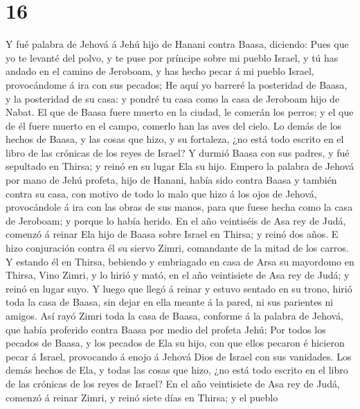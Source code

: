 \hypertarget{section-15}{%
\section{16}\label{section-15}}

 Y fué palabra de Jehová á Jehú hijo de Hanani contra Baasa,
diciendo:  Pues que yo te levanté del polvo, y te puse por
príncipe sobre mi pueblo Israel, y tú has andado en el camino de
Jeroboam, y has hecho pecar á mi pueblo Israel, provocándome á ira con
sus pecados;  He aquí yo barreré la posteridad de Baasa, y
la posteridad de su casa: y pondré tu casa como la casa de Jeroboam hijo
de Nabat.  El que de Baasa fuere muerto en la ciudad, le
comerán los perros; y el que de él fuere muerto en el campo, comerlo han
las aves del cielo.  Lo demás de los hechos de Baasa, y las
cosas que hizo, y su fortaleza, ¿no está todo escrito en el libro de las
crónicas de los reyes de Israel?  Y durmió Baasa con sus
padres, y fué sepultado en Thirsa; y reinó en su lugar Ela su hijo.
 Empero la palabra de Jehová por mano de Jehú profeta, hijo
de Hanani, había sido contra Baasa y también contra su casa, con motivo
de todo lo malo que hizo á los ojos de Jehová, provocándole á ira con
las obras de sus manos, para que fuese hecha como la casa de Jeroboam; y
porque lo había herido.  En el año veintiséis de Asa rey de
Judá, comenzó á reinar Ela hijo de Baasa sobre Israel en Thirsa; y reinó
dos años.  E hizo conjuración contra él su siervo Zimri,
comandante de la mitad de los carros. Y estando él en Thirsa, bebiendo y
embriagado en casa de Arsa su mayordomo en Thirsa,  Vino
Zimri, y lo hirió y mató, en el año veintisiete de Asa rey de Judá; y
reinó en lugar suyo.  Y luego que llegó á reinar y estuvo
sentado en su trono, hirió toda la casa de Baasa, sin dejar en ella
meante á la pared, ni sus parientes ni amigos.  Así rayó
Zimri toda la casa de Baasa, conforme á la palabra de Jehová, que había
proferido contra Baasa por medio del profeta Jehú;  Por
todos los pecados de Baasa, y los pecados de Ela su hijo, con que ellos
pecaron é hicieron pecar á Israel, provocando á enojo á Jehová Dios de
Israel con sus vanidades.  Los demás hechos de Ela, y todas
las cosas que hizo, ¿no está todo escrito en el libro de las crónicas de
los reyes de Israel?  En el año veintisiete de Asa rey de
Judá, comenzó á reinar Zimri, y reinó siete días en Thirsa; y el pueblo
